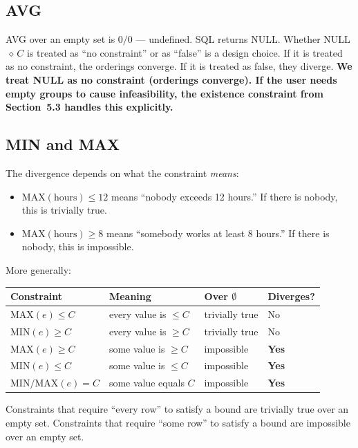 \documentclass[11pt]{article}
\begin{document}
\subsection*{AVG}

AVG over an empty set is $0/0$ --- undefined. SQL returns NULL. Whether
NULL $\, \diamond \, C$ is treated as ``no constraint'' or as ``false'' is a
design choice. If it is treated as no constraint, the orderings converge. If
it is treated as false, they diverge. \textbf{We treat NULL as no constraint
(orderings converge). If the user needs empty groups to cause infeasibility,
the existence constraint from Section~5.3 handles this explicitly.}

\subsection*{MIN and MAX}

The divergence depends on what the constraint \emph{means}:

\begin{itemize}[leftmargin=2em]
    \item $\text{MAX}(\text{hours}) \leq 12$ means ``nobody exceeds 12 hours.'' If there is nobody, this is trivially true.
    \item $\text{MAX}(\text{hours}) \geq 8$ means ``somebody works at least 8 hours.'' If there is nobody, this is impossible.
\end{itemize}
More generally:
\begin{center}
\begin{tabular}{>{\raggedright\arraybackslash}p{} >{\raggedright\arraybackslash}p{} >{\raggedright\arraybackslash}p{} >{\raggedright\arraybackslash}p{}}
\toprule
\textbf{Constraint} & \textbf{Meaning} & \textbf{Over $\emptyset$} & \textbf{Diverges?} \\
\midrule
$\text{MAX}(e) \leq C$ & every value is $\leq C$ & trivially true & No \\
$\text{MIN}(e) \geq C$ & every value is $\geq C$ & trivially true & No \\
$\text{MAX}(e) \geq C$ & some value is $\geq C$ & impossible & \textbf{Yes} \\
$\text{MIN}(e) \leq C$ & some value is $\leq C$ & impossible & \textbf{Yes} \\
$\text{MIN/MAX}(e) = C$ & some value equals $C$ & impossible & \textbf{Yes} \\
\bottomrule
\end{tabular}
\end{center}
Constraints that require ``every row'' to satisfy a bound are trivially true
over an empty set. Constraints that require ``some row'' to satisfy a bound are
impossible over an empty set.
\end{document}
